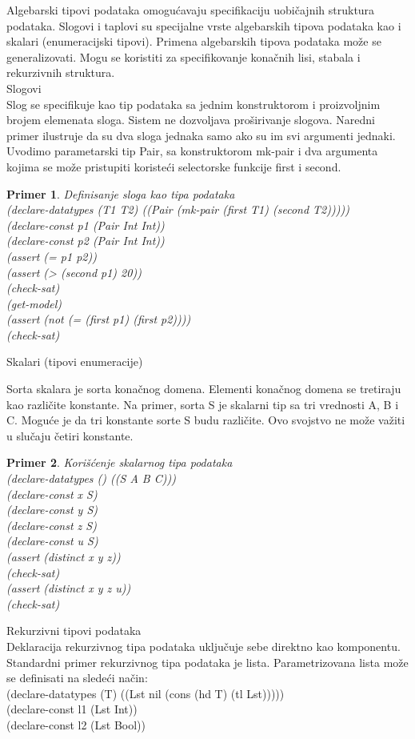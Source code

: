 \documentclass[12pt,oneside]{memoir}
\newtheorem{primer}{Primer}
\begin{document}
Algebarski tipovi podataka omogućavaju specifikaciju uobičajnih struktura podataka. Slogovi i taplovi su specijalne vrste algebarskih tipova podataka kao i skalari (enumeracijski tipovi). Primena algebarskih tipova podataka može se generalizovati. Mogu se koristiti za specifikovanje konačnih lisi, stabala i rekurzivnih struktura. \\
Slogovi 
\\
Slog se specifikuje kao tip podataka sa jednim konstruktorom i proizvoljnim brojem elemenata sloga. Sistem ne dozvoljava proširivanje slogova. Naredni primer ilustruje da su dva sloga jednaka samo ako su im svi argumenti jednaki. Uvodimo parametarski tip Pair, sa konstruktorom mk-pair i dva argumenta kojima se može pristupiti koristeći selectorske funkcije first i second.
\\
\begin{primer} Definisanje sloga kao tipa podataka
\\(declare-datatypes (T1 T2) ((Pair (mk-pair (first T1) (second T2)))))
\\(declare-const p1 (Pair Int Int))
\\(declare-const p2 (Pair Int Int))
\\(assert (= p1 p2))
\\(assert (> (second p1) 20))
\\(check-sat)
\\(get-model)
\\(assert (not (= (first p1) (first p2))))
\\(check-sat)
\end{primer}

Skalari (tipovi enumeracije)

Sorta skalara je sorta konačnog domena. Elementi konačnog domena se tretiraju kao različite konstante. Na primer, sorta S je skalarni tip sa tri vrednosti A, B i C. Moguće je da tri konstante sorte S budu različite. Ovo svojstvo ne može važiti u slučaju četiri konstante.

\begin{primer} Korišćenje skalarnog tipa podataka
\\(declare-datatypes () ((S A B C)))
\\(declare-const x S)
\\(declare-const y S)
\\(declare-const z S)
\\(declare-const u S)
\\(assert (distinct x y z))
\\(check-sat)
\\(assert (distinct x y z u))
\\(check-sat)
\end{primer}
Rekurzivni tipovi podataka
\\
Deklaracija rekurzivnog tipa podataka uključuje sebe direktno kao komponentu. Standardni primer rekurzivnog tipa podataka je lista. Parametrizovana lista može se definisati na sledeći način:\\
(declare-datatypes (T) ((Lst nil (cons (hd T) (tl Lst)))))
\\(declare-const l1 (Lst Int))
\\(declare-const l2 (Lst Bool))
\end{document}

